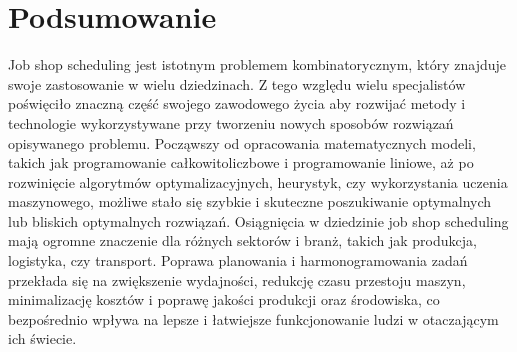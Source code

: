 \documentclass[12pt, a4paper]{report}
\begin{document}
\chapter{Podsumowanie}
  Job shop scheduling jest istotnym problemem kombinatorycznym, 
  który znajduje swoje zastosowanie w wielu dziedzinach. Z tego względu 
  wielu specjalistów poświęciło znaczną część swojego zawodowego życia aby 
  rozwijać metody i technologie wykorzystywane przy 
  tworzeniu nowych sposobów rozwiązań opisywanego problemu. 
  Począwszy od opracowania 
  matematycznych modeli, takich jak programowanie całkowitoliczbowe i 
  programowanie liniowe, aż po rozwinięcie algorytmów optymalizacyjnych, 
  heurystyk, czy wykorzystania uczenia maszynowego, 
  możliwe stało się szybkie i skuteczne poszukiwanie optymalnych 
  lub bliskich optymalnych rozwiązań. Osiągnięcia w dziedzinie job shop scheduling 
  mają ogromne znaczenie dla różnych sektorów i branż, takich jak produkcja, 
  logistyka, czy transport. Poprawa planowania i harmonogramowania zadań 
  przekłada się na zwiększenie wydajności, redukcję czasu przestoju maszyn, 
  minimalizację kosztów i poprawę jakości produkcji oraz środowiska, 
  co bezpośrednio wpływa na lepsze i łatwiejsze funkcjonowanie 
  ludzi w otaczającym ich świecie.


  \clearpage
  
  
\end{document}
